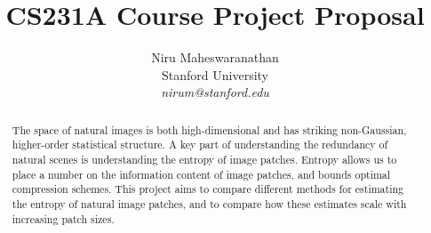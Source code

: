 \documentclass[10pt,twocolumn,letterpaper]{article}
\begin{document}
\title{CS231A Course Project Proposal}

\author{Niru Maheswaranathan\\
Stanford University\\
\textit{nirum@stanford.edu}
}

\maketitle
\thispagestyle{empty}

\begin{abstract}
The space of natural images is both high-dimensional and has striking non-Gaussian, higher-order statistical structure. A key part of understanding the redundancy of natural scenes is understanding the entropy of image patches. Entropy allows us to place a number on the information content of image patches, and bounds optimal compression schemes. This project aims to compare different methods for estimating the entropy of natural image patches, and to compare how these estimates scale with increasing patch sizes.
\end{abstract}


\end{document}
